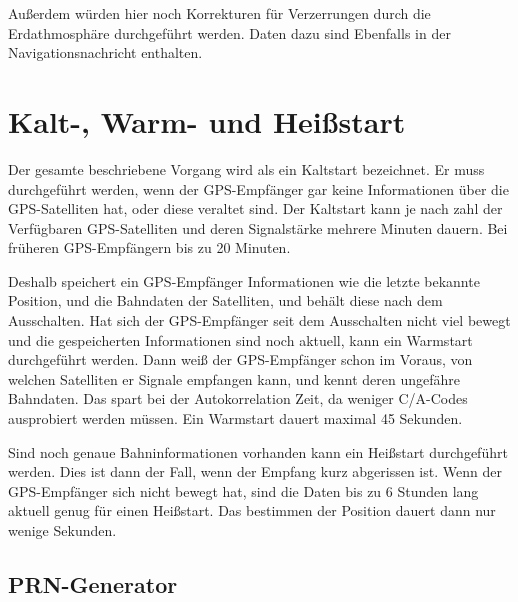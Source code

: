 \documentclass[12pt,a4paper]{scrartcl}
\begin{document}
Außerdem würden hier noch Korrekturen für Verzerrungen durch die Erdathmosphäre durchgeführt werden. Daten dazu sind Ebenfalls in der Navigationsnachricht enthalten.

\section{Kalt-, Warm- und Heißstart}
Der gesamte beschriebene Vorgang wird als ein Kaltstart bezeichnet. Er muss durchgeführt werden, wenn der GPS-Empfänger gar keine Informationen über die GPS-Satelliten hat, oder diese veraltet sind. Der Kaltstart kann je nach zahl der Verfügbaren GPS-Satelliten und deren Signalstärke mehrere Minuten dauern. Bei früheren GPS-Empfängern bis zu 20 Minuten.

Deshalb speichert ein GPS-Empfänger Informationen wie die letzte bekannte Position, und die Bahndaten der Satelliten, und behält diese nach dem Ausschalten. Hat sich der GPS-Empfänger seit dem Ausschalten nicht viel bewegt und die gespeicherten Informationen sind noch aktuell, kann ein Warmstart durchgeführt werden. Dann weiß der GPS-Empfänger schon im Voraus, von welchen Satelliten er Signale empfangen kann, und kennt deren ungefähre Bahndaten. Das spart bei der Autokorrelation Zeit, da weniger C/A-Codes ausprobiert werden müssen. Ein Warmstart dauert maximal 45 Sekunden.

Sind noch genaue Bahninformationen vorhanden kann ein Heißstart durchgeführt werden. Dies ist dann der Fall, wenn der Empfang kurz abgerissen ist. Wenn der GPS-Empfänger sich nicht bewegt hat, sind die Daten bis zu 6 Stunden lang aktuell genug für einen Heißstart. Das bestimmen der Position dauert dann nur wenige Sekunden.

\newpage
\printbibliography
\newpage

\begin{appendix}
\section{PRN-Generator}
\end{appendix}
\end{document}
